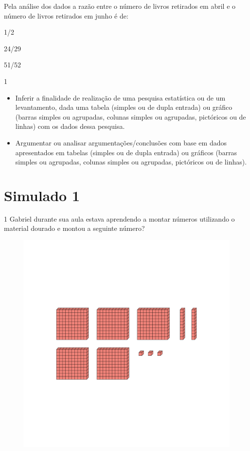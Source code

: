 Pela análise dos dados a razão entre o número de livros retirados em
abril e o número de livros retirados em junho é de:

\begin{escolha}
\item
  1/2
\item
  24/29
\item
  51/52
\item
  1
\end{escolha}



\begin{itemize}
\item Inferir a finalidade de realização de uma pesquisa estatística ou de
um levantamento, dada uma tabela (simples ou de dupla entrada) ou
gráfico (barras simples ou agrupadas, colunas simples ou agrupadas,
pictóricos ou de linhas) com os dados dessa pesquisa.

\item Argumentar ou analisar argumentações/conclusões com base em dados
apresentados em tabelas (simples ou de dupla entrada) ou gráficos
(barras simples ou agrupadas, colunas simples ou agrupadas, pictóricos
ou de linhas).
\end{itemize}


\chapter{Simulado 1}

\num{1} Gabriel durante sua aula estava aprendendo a montar números
utilizando o material dourado e montou a seguinte número?

\begin{figure}[htpb!]
\includegraphics[width=\textwidth]{../ilustracoes/MAT5/SAEB_5ANO_MAT_figura112.png}
\end{figure}

